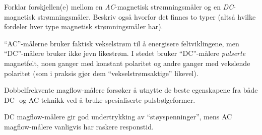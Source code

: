 

Forklar forskjellen(e) mellom en \textit{AC}-magnetisk strømningsmåler og en \textit{DC}-magnetisk strømningsmåler. Beskriv også hvorfor det finnes to typer (altså hvilke fordeler hver type magnetisk strømningsmåler har).







``AC''-målerne bruker faktisk vekselstrøm til å energisere feltviklingene, men ``DC''-målere bruker ikke jevn likestrøm. I stedet bruker ``DC''-målere \textit{pulserte} magnetfelt, noen ganger med konstant polaritet og andre ganger med vekslende polaritet (som i praksis gjør dem ``vekselstrømsaktige'' likevel).

Dobbelfrekvente magflow-målere forsøker å utnytte de beste egenskapene fra både DC- og AC-teknikk ved å bruke spesialiserte pulsbølgeformer.

\vskip 10pt

DC magflow-målere gir god undertrykking av ``støyspenninger'', mens AC magflow-målere vanligvis har raskere responstid.









